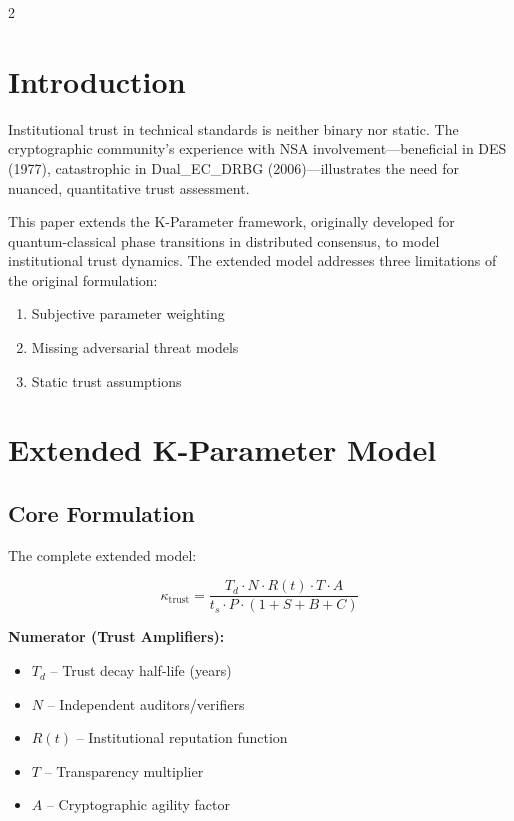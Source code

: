 \documentclass[11pt]{article}
\begin{document}
\begin{multicols}{2}

\section{Introduction}

Institutional trust in technical standards is neither binary nor static. The cryptographic community's experience with NSA involvement---beneficial in DES (1977), catastrophic in Dual\_EC\_DRBG (2006)---illustrates the need for nuanced, quantitative trust assessment.

This paper extends the K-Parameter framework, originally developed for quantum-classical phase transitions in distributed consensus, to model institutional trust dynamics. The extended model addresses three limitations of the original formulation:

\begin{enumerate}[noitemsep]
\item Subjective parameter weighting
\item Missing adversarial threat models
\item Static trust assumptions
\end{enumerate}

\section{Extended K-Parameter Model}

\subsection{Core Formulation}

The complete extended model:

\begin{equation}
\boxed{\kappa_{\text{trust}} = \frac{T_d \cdot N \cdot R(t) \cdot T \cdot A}{t_s \cdot P \cdot (1 + S + B + C)}}
\end{equation}

\textbf{Numerator (Trust Amplifiers):}
\begin{itemize}[noitemsep]
\item $T_d$ -- Trust decay half-life (years)
\item $N$ -- Independent auditors/verifiers
\item $R(t)$ -- Institutional reputation function
\item $T$ -- Transparency multiplier
\item $A$ -- Cryptographic agility factor
\end{itemize}


\end{multicols}
\end{document}
